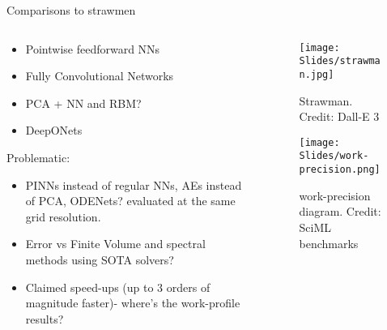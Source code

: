 \documentclass[usenames,dvipsnames]{beamer}
\theoremstyle{definition}
\begin{document}
\begin{frame}{Comparisons to strawmen}
    \begin{columns}
    \begin{column}{0.56\textwidth}
    \begin{itemize}
        \item Pointwise feedforward NNs

        \item Fully Convolutional Networks \cite{Zhu2018}

        \item PCA + NN and RBM?

        \item DeepONets
    \end{itemize}

    Problematic:
    
    \begin{itemize}
        \item PINNs instead of regular NNs, AEs instead of PCA, ODENets? evaluated at the same grid resolution.

        \item Error vs Finite Volume and spectral methods using SOTA solvers?

        \item Claimed speed-ups (up to 3 orders of magnitude faster)- where's the work-profile results?
    \end{itemize}
    \end{column}

    \begin{column}{0.48\textwidth}
        \begin{figure}
            \centering
            \texttt{[image: Slides/strawman.jpg]}
            \caption{Strawman. Credit: Dall-E 3}
            \label{fig:strawmen}
        \end{figure}

        \begin{figure}
            \centering
            \texttt{[image: Slides/work-precision.png]}
            \caption{work-precision diagram. Credit: SciML benchmarks}
            \label{fig:strawmen}
        \end{figure}
        
    \end{column}
        
    \end{columns}
    
\end{frame}
\end{document}
